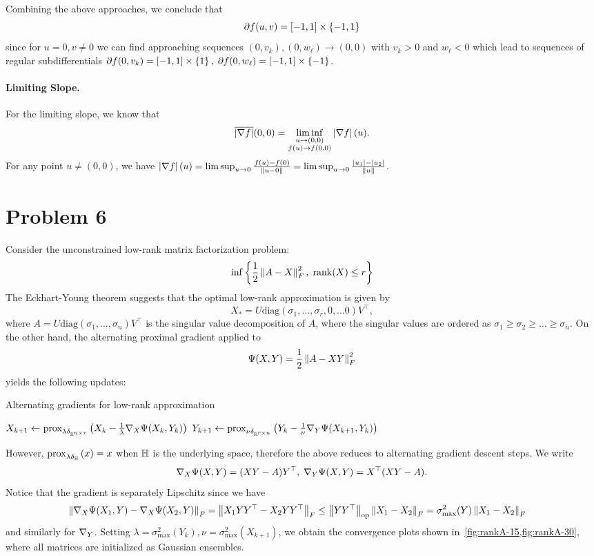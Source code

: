 \documentclass[10pt]{article}
\begin{document}
Combining the above approaches, we conclude that
\[
    \partial f(u, v) = [-1, 1] \times \left\{ -1, 1 \right\}
\]
since for $u = 0, v \neq 0$ we can find approaching sequences $(0, v_k), (0,
w_{\ell}) \to (0, 0)$ with $v_k > 0$ and $w_{\ell} < 0$ which lead to sequences
of regular subdifferentials $\partial f(0, v_k) = [-1, 1] \times \left\{ 1 \right\}, \;
\partial f(0, w_{\ell}) = [-1, 1] \times \left\{ -1 \right\}$.


\paragraph{Limiting Slope.}
For the limiting slope, we know that
\[
    \overline{\left| \nabla f \right|}(0, 0) = \liminf_{\substack{u \to (0, 0) \\ f(u)
    \to f(0, 0)}} \left| \nabla f \right|(u).
\]
For any point $u \neq (0, 0)$, we have $\left| \nabla f \right|(u) =
\limsup_{u \to 0} \frac{f(u) - f(0)}{\left \| u - 0 \right \|} = \limsup_{u \to 0}
\frac{\left| u_1 \right| - \left| u_2 \right|}{\left \| u \right \|}$.

\section*{Problem 6}
Consider the unconstrained low-rank matrix factorization problem:
\[
    \inf\left\{ \frac{1}{2}\left \| A - X \right \|_F^2, \; \mathrm{rank}(X) \leq r \right\}
\]
The Eckhart-Young theorem suggests that the optimal low-rank approximation is
given by
\[
    X_* = U \mathrm{diag}(\sigma_1, \dots, \sigma_r, 0, \dots 0) V^\top,
\]
where $A = U \mathrm{diag}(\sigma_1, \dots, \sigma_n) V^\top$ is the singular
value
decomposition of $A$, where the singular values are ordered as $\sigma_1 \geq
\sigma_2 \geq \dots \geq \sigma_n$.
On the other hand, the alternating proximal gradient applied to
\[
    \Psi(X, Y) = \frac{1}{2} \left \| A - XY \right \|_F^2
\]
yields the following updates:
\begin{algorithm}
    \caption{Alternating gradients for low-rank approximation}
    \begin{algorithmic}
        \Repeat
            \State $X_{k+1} \gets \mathrm{prox}_{\lambda \delta_{\mathbb{R}^{n \times r}}}\left( 
                X_k - \frac{1}{\lambda} \nabla_X \Psi(X_k, Y_k) \right)$
            \State $Y_{k+1} \gets \mathrm{prox}_{\nu \delta_{\mathbb{R}^{r \times n}}}\left( 
                Y_k - \frac{1}{\nu} \nabla_Y \Psi(X_{k+1}, Y_k) \right)$
    \end{algorithmic}
\end{algorithm}
However, $\mathrm{prox}_{\lambda \delta_{\mathbb{H}}}\left( x \right) = x$ when $\mathbb{H}$ is the underlying
space, therefore the above reduces to alternating gradient descent steps.
We write
\[
    \nabla_X \Psi(X, Y) = (XY - A) Y^\top, \; \nabla_Y \Psi(X, Y) = X^\top (XY -
    A).
\]
Notice that the gradient is separately Lipschitz since we have
\begin{align*}
    \left \| \nabla_{X} \Psi(X_1, Y) - \nabla_X \Psi(X_2, Y) \right \|_F &=
        \left \| X_1 Y Y^\top - X_2 Y Y^\top \right \|_F \leq \left \|  YY^\top  \right \|_{\mathrm{op}}
        \left \| X_1 - X_2 \right \|_F = \sigma_{\max}^2(Y) \left \| X_1 - X_2 \right \|_F
\end{align*}
and similarly for $\nabla_Y$. Setting $\lambda = \sigma_{\max}^2(Y_k), \nu =
\sigma_{\max}^2(X_{k+1})$, we obtain the convergence plots shown
in~\cref{fig:rankA-15,fig:rankA-30}, where all matrices are initialized as
Gaussian ensembles.
\end{document}
